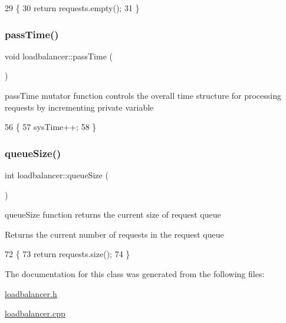 \begin{DoxyCode}
29                            \{
30     \textcolor{keywordflow}{return} requests.empty();
31 \}
\end{DoxyCode}
\mbox{\label{classloadbalancer_a4d793bdf97c72b577ada58a774c3bddb}} 
\subsubsection{\texorpdfstring{pass\+Time()}{passTime()}}
{\footnotesize\ttfamily void loadbalancer\+::pass\+Time (\begin{DoxyParamCaption}{ }\end{DoxyParamCaption})}

pass\+Time mutator function controls the overall time structure for processing requests by incrementing private variable 
\begin{DoxyCode}
56                             \{
57     sysTime++;
58 \}
\end{DoxyCode}
\mbox{\label{classloadbalancer_a9716bb001708f3c7792df0d1c8689ab0}} 
\subsubsection{\texorpdfstring{queue\+Size()}{queueSize()}}
{\footnotesize\ttfamily int loadbalancer\+::queue\+Size (\begin{DoxyParamCaption}{ }\end{DoxyParamCaption})}

queue\+Size function returns the current size of request queue \begin{DoxyReturn}{Returns}
the current number of requests in the request queue 
\end{DoxyReturn}

\begin{DoxyCode}
72                             \{
73     \textcolor{keywordflow}{return} requests.size();
74 \}
\end{DoxyCode}


The documentation for this class was generated from the following files\+:\begin{DoxyCompactItemize}
\item 
\hyperlink{loadbalancer_8h}{loadbalancer.\+h}\item 
\hyperlink{loadbalancer_8cpp}{loadbalancer.\+cpp}\end{DoxyCompactItemize}
